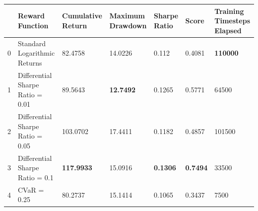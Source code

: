 \begin{tabular}{lllllll}
\toprule
 & Reward Function & Cumulative Return & Maximum Drawdown & Sharpe Ratio & Score & Training Timesteps Elapsed \\
\midrule
0 & Standard Logarithmic Returns & 82.4758 & 14.0226 & 0.112 & 0.4081 & \textbf{110000} \\
1 & Differential Sharpe Ratio = 0.01 & 89.5643 & \textbf{12.7492} & 0.1265 & 0.5771 & 64500 \\
2 & Differential Sharpe Ratio = 0.05 & 103.0702 & 17.4411 & 0.1182 & 0.4857 & 101500 \\
3 & Differential Sharpe Ratio = 0.1 & \textbf{117.9933} & 15.0916 & \textbf{0.1306} & \textbf{0.7494} & 33500 \\
4 & CVaR = 0.25 & 80.2737 & 15.1414 & 0.1065 & 0.3437 & 7500 \\
\bottomrule
\end{tabular}
